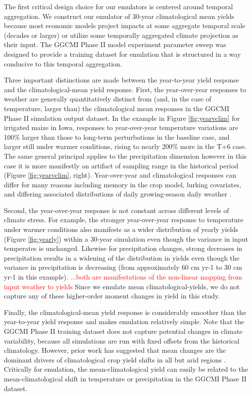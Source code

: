 \documentclass[gmd, manuscript]{copernicus} %
\begin{document}
The first critical design choice for our emulators is centered around temporal aggregation.
We construct our emulator of 30-year climatological mean yields because most economic models project impacts at some aggregate temporal scale (decades or larger) or utilize some temporally aggregated climate projection as their input.
The GGCMI Phase II model experiment parameter sweep was designed to provide a training dataset for emulation that is structured in a way conducive to this temporal aggregation.

Three important distinctions are made between the year-to-year yield response and the climatological-mean yield response.
First, the year-over-year responses to weather are generally quantitatively distinct from (and, in the case of temperature, larger than) the climatological mean responses in the GGCMI Phase II simulation output dataset. 
In the example in Figure \ref{fig:yearvclim} for irrigated maize in Iowa, responses to year-over-year temperature variations are 100\% larger than those to long-term perturbations in the baseline case, and larger still under warmer conditions, rising to nearly 200\% more in the T+6 case. 
The same general principal applies to the precipitation dimension however in this case it is more manifestly an artifact of sampling range in the historical period (Figure \ref{fig:yearvclim}, right).
Year-over-year and climatological responses can differ for many reasons including memory in the crop model, lurking covariates, and differing associated distributions of daily growing-season daily weather \citep[e.g.][]{Ruane2016}. 

Second, the year-over-year response is not constant across different levels of climate stress. 
For example, the stronger year-over-year response to temperature under warmer conditions also manifests as a wider distribution of yearly yields (Figure \ref{fig:yearly}) within a 30-year simulation even though the variance in input temperates is unchanged. 
Likewise for precipitation changes, strong decreases in precipitation results in a widening of the distribution in yields even though the variance in precipitation is decreasing (from approximately 60 cm yr-1 to 30 cm yr-1 in this example). 
\textcolor{red}{...both are manifestations of the non-linear mapping from input weather to yields}
Since we emulate mean climatological-yields, we do not capture any of these higher-order moment changes in yield in this study.

Finally, the climatological-mean yield response is considerably smoother than the year-to-year yield response and makes emulation relatively simple. 
Note that the GGCMI Phase II training dataset does not capture potential changes in climate variability, because all simulations are run with fixed offsets from the historical climatology.
However, prior work has suggested that mean changes are the dominant drivers of climatological crop yield shifts in all but arid regions \citep[e.g.][]{Glotter14}.
Critically for emulation, the mean-climatological yield can easily be related to the mean-climatological shift in temperature or precipitation in the GGCMI Phase II dataset.
\end{document}
